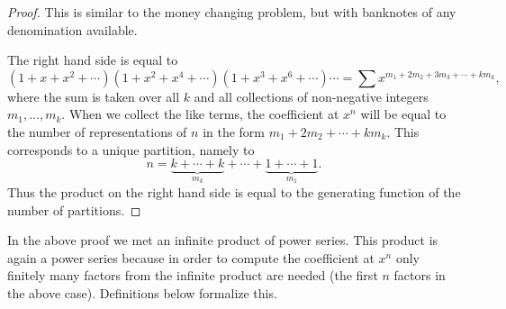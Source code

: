 

\setcounter{section}{3}
\setcounter{subsection}{4}
\setcounter{dfn}{5}

\begin{proof}
This is similar to the money changing problem, but with banknotes of any denomination available.

The right hand side is equal to
\[
(1+x+x^2+\cdots)(1+x^2+x^4+\cdots)(1+x^3+x^6+\cdots)\cdots = \sum x^{m_1 + 2m_2 + 3m_3 + \cdots + km_k},
\]
where the sum is taken over all $k$ and all collections of non-negative integers $m_1, \ldots, m_k$.
When we collect the like terms, the coefficient at $x^n$ will be equal to the number of representations of $n$ in the form
$m_1 + 2m_2 + \cdots + km_k$.
This corresponds to a unique partition, namely to
\[
n = \underbrace{k+\cdots+k}_{m_k} + \cdots + \underbrace{1+\cdots+1}_{m_1}.
\]
Thus the product on the right hand side is equal to the generating function of the number of partitions.
\end{proof}

In the above proof we met an infinite product of power series.
This product is again a power series because in order to compute the coefficient at $x^n$
only finitely many factors from the infinite product are needed (the first $n$ factors in the above case).
Definitions below formalize this.



